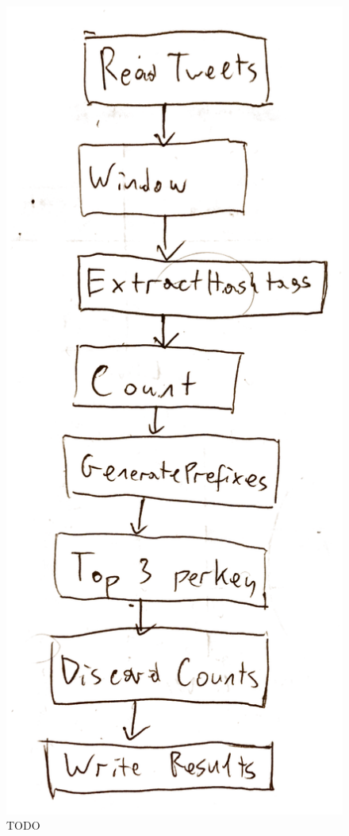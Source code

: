 \begin{figure}
	\centering
	\includegraphics[height=0.5\textheight]{images/temp/eval-twitter-pipeline}
	\caption[The Twitter example Pipeline as a Directed Acyclic Graph.]{TODO}
	\label{fig:eval:twitter-pipeline-dag}
\end{figure}


